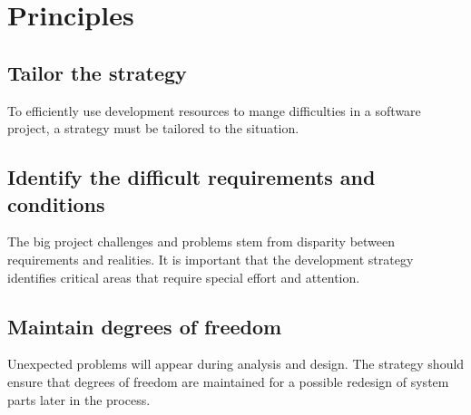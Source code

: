 \section{Principles}
\subsection{Tailor the strategy}
To efficiently use development resources to mange difficulties in a software project, a strategy must be tailored to the situation.

\subsection{Identify the difficult requirements and conditions}
The big project challenges and problems stem from disparity between requirements and realities. It is important that the development strategy identifies critical areas that require special effort and attention.

\subsection{Maintain degrees of freedom}
Unexpected problems will appear during analysis and design. The strategy should ensure that degrees of freedom are maintained for a possible redesign of system parts later in the process.

